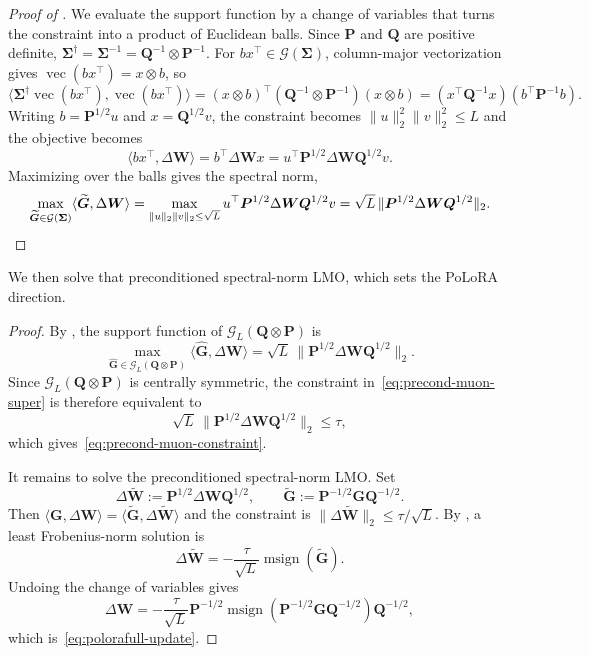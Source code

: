 \documentclass[11pt]{article}
\renewcommand{\vec}{\operatorname{vec}}
\newcommand{\mat}[1]{\bm{#1}}
\newcommand{\ip}[1]{\langle #1 \rangle}
\DeclareMathOperator{\msign}{msign}          %
\newcommand{\norm}[1]{\| #1\|}
\newcommand{\methodname}{PoLoRA\xspace}
\begin{document}
\begin{proof}[Proof of ]
We evaluate the support function by a change of variables that turns the
constraint into a product of Euclidean balls. Since $\mat{P}$ and $\mat{Q}$ are positive
definite, $\mat{\Sigma}^\dagger=\mat{\Sigma}^{-1}=\mat{Q}^{-1}\otimes \mat{P}^{-1}$. For
$bx^\top\in\mathcal{G}(\mat{\Sigma})$, column-major vectorization gives
$\vec(bx^\top)=x\otimes b$, so
\[
\ip{\mat{\Sigma}^\dagger\vec(bx^\top),\vec(bx^\top)}
=(x\otimes b)^\top(\mat{Q}^{-1}\otimes \mat{P}^{-1})(x\otimes b)
=(x^\top \mat{Q}^{-1}x)(b^\top \mat{P}^{-1}b).
\]
Writing $b=\mat{P}^{1/2}u$ and $x=\mat{Q}^{1/2}v$, the constraint becomes
$\norm{u}_2^2\norm{v}_2^2\leq L$ and the objective becomes
\[
\ip{bx^\top,\Delta\mat{W}}=b^\top\Delta\mat{W} x=u^\top \mat{P}^{1/2}\Delta\mat{W} \mat{Q}^{1/2}v .
\]
Maximizing over the balls gives the spectral norm,
\[
\max_{\widetilde{\mat{G}}\in\mathcal{G}(\mat{\Sigma})}\ip{\widetilde{\mat{G}},\Delta\mat{W}}
=\max_{\norm{u}_2\norm{v}_2\leq\sqrt{L}}u^\top \mat{P}^{1/2}\Delta\mat{W} \mat{Q}^{1/2}v
=\sqrt{L}\,\norm{\mat{P}^{1/2}\Delta\mat{W} \mat{Q}^{1/2}}_2. \qedhere
\]
\end{proof}

We then solve that preconditioned spectral-norm LMO, which sets the \methodname{} direction.


\precomuon*
\begin{proof}
By , the support function of $\mathcal{G}_L(\mat{Q}\otimes \mat{P})$ is
\[
  \max_{\widehat{\mat{G}}\in\mathcal{G}_L(\mat{Q}\otimes \mat{P})}
  \ip{\widehat{\mat{G}},\Delta\mat{W}}
  =\sqrt L\,\norm{\mat{P}^{1/2}\Delta\mat{W} \mat{Q}^{1/2}}_2 .
\]
Since $\mathcal{G}_L(\mat{Q}\otimes \mat{P})$ is centrally symmetric, the constraint in~\eqref{eq:precond-muon-super} is therefore equivalent to
\[
  \sqrt L\,\norm{\mat{P}^{1/2}\Delta\mat{W} \mat{Q}^{1/2}}_2\le\tau,
\]
which gives~\eqref{eq:precond-muon-constraint}.

It remains to solve the preconditioned spectral-norm LMO. Set
\[
  \Delta\widetilde{\mat{W}} := \mat{P}^{1/2}\Delta\mat{W} \mat{Q}^{1/2},
  \qquad
  \widetilde{\mat{G}} := \mat{P}^{-1/2}\mat{G}\mat{Q}^{-1/2}.
\]
Then $\ip{\mat{G},\Delta\mat{W}}=\ip{\widetilde{\mat{G}},\Delta\widetilde{\mat{W}}}$ and the constraint is
$\norm{\Delta\widetilde{\mat{W}}}_2\le\tau/\sqrt L$. By , a least Frobenius-norm solution is
\[
  \Delta\widetilde{\mat{W}}
  =
  -\frac{\tau}{\sqrt L}\msign(\widetilde{\mat{G}}).
\]
Undoing the change of variables gives
\[
  \Delta\mat{W}
  =
  -\frac{\tau}{\sqrt L}
  \mat{P}^{-1/2}\msign(\mat{P}^{-1/2}\mat{G}\mat{Q}^{-1/2})\mat{Q}^{-1/2},
\]
which is~\eqref{eq:polorafull-update}.
\end{proof}
\end{document}
